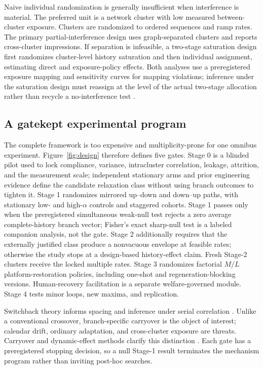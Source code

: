 \documentclass[pdflatex,sn-mathphys-num]{sn-jnl}
\begin{document}
Naive individual randomization is generally insufficient when interference is material. The preferred unit is a network cluster with low measured between-cluster exposure. Clusters are randomized to ordered sequences and ramp rates. The primary partial-interference design uses graph-separated clusters and reports cross-cluster impressions. If separation is infeasible, a two-stage saturation design first randomizes cluster-level history saturation and then individual assignment, estimating direct and exposure-policy effects. Both analyses use a preregistered exposure mapping and sensitivity curves for mapping violations; inference under the saturation design must reassign at the level of the actual two-stage allocation rather than recycle a no-interference test \cite{hudgens2008interference,aronow2017interference,liu2026saturation}.

\subsection{A gatekept experimental program}

The complete framework is too expensive and multiplicity-prone for one omnibus experiment. Figure~\ref{fig:design} therefore defines five gates. Stage 0 is a blinded pilot used to lock compliance, variance, intracluster correlation, leakage, attrition, and the measurement scale; independent stationary arms and prior engineering evidence define the candidate relaxation class without using branch outcomes to tighten it. Stage 1 randomizes mirrored up--down and down--up paths, with stationary low- and high-$\alpha$ controls and staggered cohorts. Stage 1 passes only when the preregistered simultaneous weak-null test rejects a zero average complete-history branch vector; Fisher's exact sharp-null test is a labeled companion analysis, not the gate. Stage 2 additionally requires that the externally justified class produce a nonvacuous envelope at feasible rates; otherwise the study stops at a design-based history-effect claim. Fresh Stage-2 clusters receive the locked multiple rates. Stage 3 randomizes factorial $M/L$ platform-restoration policies, including one-shot and regeneration-blocking versions. Human-recovery facilitation is a separate welfare-governed module. Stage 4 tests minor loops, new maxima, and replication.

Switchback theory informs spacing and inference under serial correlation \cite{bojinov2023switchback}. Unlike a conventional crossover, branch-specific carryover is the object of interest; calendar drift, ordinary adaptation, and cross-cluster exposure are threats. Carryover and dynamic-effect methods clarify this distinction \cite{wang2024carryover,sun2025dynamic}. Each gate has a preregistered stopping decision, so a null Stage-1 result terminates the mechanism program rather than inviting post-hoc searches.
\end{document}
